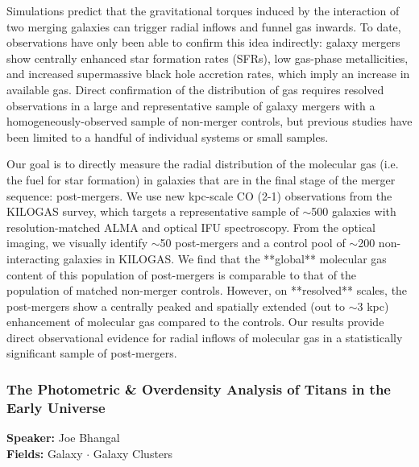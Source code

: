 Simulations predict that the gravitational torques induced by the interaction of two merging galaxies can trigger radial inflows and funnel gas inwards. To date, observations have only been able to confirm this idea indirectly: galaxy mergers show centrally enhanced star formation rates (SFRs), low gas-phase metallicities, and increased supermassive black hole accretion rates, which imply an increase in available gas. Direct confirmation of the distribution of gas requires resolved observations in a large and representative sample of galaxy mergers with a homogeneously-observed sample of non-merger controls, but previous studies have been limited to a handful of individual systems or small samples.

Our goal is to directly measure the radial distribution of the molecular gas (i.e. the fuel for star formation) in galaxies that are in the final stage of the merger sequence: post-mergers. We use new kpc-scale CO (2-1) observations from the KILOGAS survey, which targets a representative sample of $\sim$500 galaxies with resolution-matched ALMA and optical IFU spectroscopy. From the optical imaging, we visually identify $\sim$50 post-mergers and a control pool of $\sim$200 non-interacting galaxies in KILOGAS. We find that the **global** molecular gas content of this population of post-mergers is comparable to that of the population of matched non-merger controls. However, on **resolved** scales, the post-mergers show a centrally peaked and spatially extended (out to $\sim$3 kpc) enhancement of molecular gas compared to the controls. Our results provide direct observational evidence for radial inflows of molecular gas in a statistically significant sample of post-mergers.

\hypertarget{abstract-talk-136}{}\label{abstract-page-talk-136}
\subsubsection*{The Photometric \& Overdensity Analysis of Titans in the Early Universe}
\textbf{Speaker:} Joe Bhangal\\
\textbf{Fields:} Galaxy $\cdot$ Galaxy Clusters

